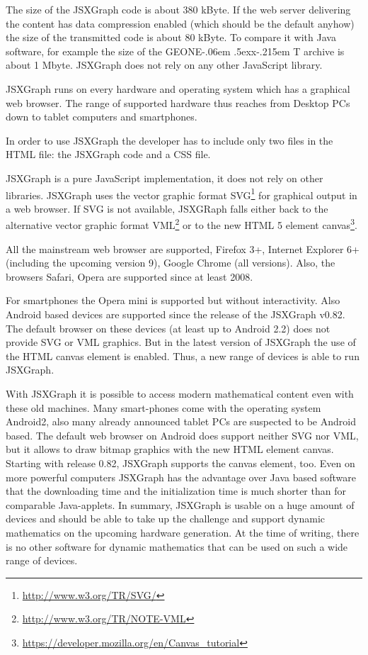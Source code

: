 \documentclass[12pt,a4paper]{article}%
\def\GEONExT{GEONE\kern-.06em \lower.5ex\hbox{x}\kern-.215em T}
\begin{document}
The  size 
of the JSXGraph code is about 380 kByte. If the web server delivering the 
content has data compression enabled (which should be the default anyhow) the 
size of the transmitted code is about 80 kByte. To compare it with Java software, 
for example the size of the \GEONExT{} archive is about 1 Mbyte. JSXGraph does not 
rely on any other JavaScript library.

JSXGraph runs on every hardware and operating system which has a graphical 
web browser. The range of supported hardware thus reaches from Desktop PCs 
down to tablet computers and smartphones.

In order to use JSXGraph the developer has to include only two files in the 
HTML file: the JSXGraph code and a CSS file. 

JSXGraph is a pure JavaScript implementation, it does not rely on other 
libraries. JSXGraph uses the vector graphic format SVG\footnote{\href{http://www.w3.org/TR/SVG/}{http://www.w3.org/TR/SVG/}} 
for graphical output in a web browser. 
If SVG is not available, JSXGRaph falls either 
back to the alternative vector graphic format VML\footnote{\href{http://www.w3.org/TR/NOTE-VML}{http://www.w3.org/TR/NOTE-VML}} or 
to the new HTML 5 element canvas\footnote{\href{https://developer.mozilla.org/en/Canvas_tutorial}{https://developer.mozilla.org/en/Canvas\_tutorial}}.

All the mainstream web browser are supported, Firefox 3+, Internet Explorer
6+ (including the upcoming version 9), Google Chrome (all versions). 
Also, the browsers Safari, Opera are supported since at least 2008. 

For smartphones the Opera mini is supported but without interactivity.
Also Android based devices are supported since the release of the JSXGraph v0.82.
The default browser on these devices (at least up to Android 2.2) does not provide
SVG or VML graphics. But in the latest version of JSXGraph 
the use of the HTML canvas element is enabled. Thus, a new range of devices is 
able to run JSXGraph.

With  JSXGraph it is possible to access modern mathematical content even with these old machines.
Many smart-phones come with the operating system Android2, also many already announced tablet PCs are suspected to be Android based. The default web browser on Android does support neither SVG nor VML, but it allows to draw bitmap graphics with the new HTML element canvas. Starting with release 0.82, JSXGraph supports the canvas element, too. 
Even on more powerful computers JSXGraph has the advantage over Java based software that the downloading time and the initialization time is much shorter than for comparable Java-applets. 
In summary, JSXGraph is usable on a huge amount of devices and should be able to take up the challenge and support dynamic mathematics on the upcoming hardware generation.
At the time of writing, there is no other software for dynamic mathematics that can be used on such a wide range of devices.
\end{document}

